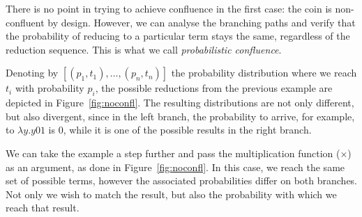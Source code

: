 There is no point in trying to achieve confluence in the first case: the coin is non-confluent by design. However, we can analyse the branching paths and verify that the probability of reducing to a particular term stays the same, regardless of the reduction sequence. This is what we call \textit{probabilistic confluence}.

Denoting by $[(p_1,t_1),\dots,(p_n,t_n)]$ the probability distribution where we reach $t_i$ with probability $p_i$, the possible reductions from the previous example are depicted in Figure~\ref{fig:noconfl}. The resulting distributions are not only different, but also divergent, since in the left branch, the probability to arrive, for example, to $\lambda y.y01$ is $0$, while it is one of the possible results in the right branch.

We can take the example a step further and pass the multiplication function ($\times$) as an argument, as done in Figure~\ref{fig:noconfl}. In this case, we reach the same set of possible terms, however the associated probabilities differ on both branches. Not only we wish to match the result, but also the probability with which we reach that result.


